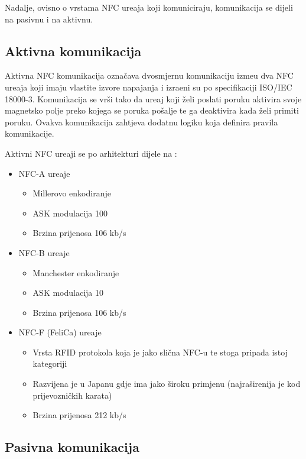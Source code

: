 Nadalje, ovisno o vrstama NFC ure\dj aja koji komuniciraju, komunikacija se dijeli na pasivnu i na aktivnu.


\subsection{Aktivna komunikacija}

Aktivna NFC komunikacija ozna\v{c}ava dvosmjernu komunikaciju izme\dj u dva NFC ure\dj aja koji imaju vlastite izvore napajanja i izra\dj eni su po specifikaciji ISO/IEC 18000-3. Komunikacija se vr\v{s}i tako da ure\dj aj koji \v{z}eli poslati poruku aktivira svoje magnetsko polje preko kojega se poruka po\v{s}alje te ga deaktivira kada \v{z}eli primiti poruku. Ovakva komunikacija zahtjeva dodatnu logiku koja definira pravila komunikacije.

Aktivni NFC ure\dj aji se po arhitekturi dijele na \cite{nfc_types}:

\begin{itemize}
	\item NFC-A ure\dj aje
	\begin{itemize}
		\item Millerovo enkodiranje
		\item ASK modulacija 100%
		\item Brzina prijenosa 106 kb/s
	\end{itemize}

	\item NFC-B ure\dj aje
	\begin{itemize}
		\item Manchester enkodiranje
		\item ASK modulacija 10%
		\item Brzina prijenosa 106 kb/s
	\end{itemize}

	\item NFC-F (FeliCa) ure\dj aje
	\begin{itemize}
		\item Vrsta RFID protokola koja je jako sli\v{c}na NFC-u te stoga pripada istoj kategoriji
		\item Razvijena je u Japanu gdje ima jako \v{s}iroku primjenu (najra\v{s}irenija je kod prijevozni\v{c}kih karata)
		\item  Brzina prijenosa 212 kb/s
	\end{itemize}
\end{itemize}


\subsection{Pasivna komunikacija}

